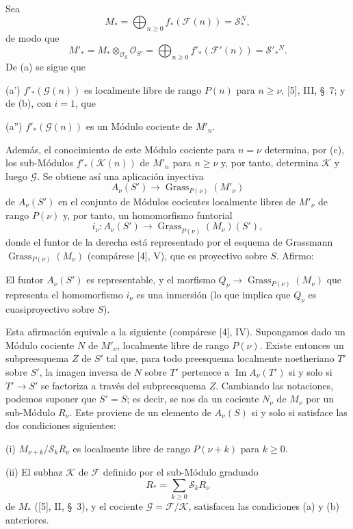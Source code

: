 Sea
\[
M_* =\bigoplus_{n\geq0}f_*(\mathcal F(n))=\mathcal S_*^{N},
\]
de modo que
\[
M'_* =M_*\otimes_{\mathcal O_S}\mathcal O_{S'}
=\bigoplus_{n\geq0}f'_*(\mathcal F'(n))=\mathcal S'_*{}^{N}.
\]
De (a) se sigue que

\noindent (a') $f'_*(\mathcal G(n))$ es localmente libre de rango $P(n)$ para
$n\geq\nu$, [5], III, \S~7; y de (b), con $i=1$, que

\noindent (a'') $f'_*(\mathcal G(n))$ es un Módulo cociente de $M'_n$.

Además, el conocimiento de este Módulo cociente para $n=\nu$ determina, por
(c), los sub-Módulos $f'_*(\mathcal K(n))$ de $M'_n$ para $n\geq\nu$ y, por
tanto, determina $\mathcal K$ y luego $\mathcal G$. Se obtiene así una
aplicación inyectiva
\[
A_\nu(S')\longrightarrow\operatorname{Grass}_{P(\nu)}(M'_\nu)
\]
de $A_\nu(S')$ en el conjunto de Módulos cocientes localmente libres de
$M'_\nu$ de rango $P(\nu)$ y, por tanto, un homomorfismo funtorial
\[
i_\nu:A_\nu(S')\longrightarrow
\underline{\operatorname{Grass}}_{P(\nu)}(M_\nu)(S'),
\]
donde el funtor de la derecha está representado por el esquema de Grassmann
$\operatorname{Grass}_{P(\nu)}(M_\nu)$ (compárese [4], V), que es proyectivo
sobre $S$. Afirmo:

 El funtor $A_\nu(S')$ es representable, y el morfismo
$Q_\nu\longrightarrow\operatorname{Grass}_{P(\nu)}(M_\nu)$ que representa el
homomorfismo $i_\nu$ es una inmersión (lo que implica que $Q_\nu$ es
cuasiproyectivo sobre $S$).

Esta afirmación equivale a la siguiente (compárese [4], IV). Supongamos dado
un Módulo cociente $N$ de $M'_\nu$, localmente libre de rango $P(\nu)$. Existe
entonces un subpreesquema $Z$ de $S'$ tal que, para todo preesquema localmente
noetheriano $T'$
sobre $S'$, la imagen inversa de $N$ sobre $T'$ pertenece a
$\operatorname{Im}A_\nu(T')$ si y solo si $T'\longrightarrow S'$ se factoriza
a través del subpreesquema $Z$. Cambiando las notaciones, podemos suponer que
$S'=S$; es decir, se nos da un cociente $N_\nu$ de $M_\nu$ por un sub-Módulo
$R_\nu$. Este proviene de un elemento de $A_\nu(S)$ si y solo si satisface las
dos condiciones siguientes:

\medskip
\noindent (i) $M_{\nu+k}/\mathcal S_kR_\nu$ es localmente libre de rango
$P(\nu+k)$ para $k\geq0$.

\smallskip
\noindent (ii) El subhaz $\mathcal K$ de $\mathcal F$ definido por el
sub-Módulo graduado
\[
R_* =\sum_{k\geq0}\mathcal S_kR_\nu
\]
de $M_*$ ([5], II, \S~3), y el cociente
$\mathcal G=\mathcal F/\mathcal K$, satisfacen las condiciones (a) y (b)
anteriores.

